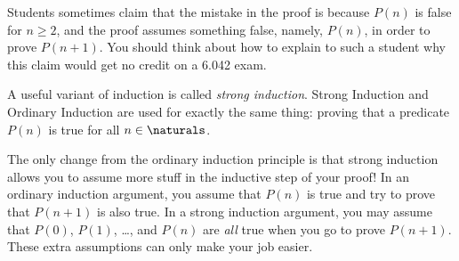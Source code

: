 \fi %

Students sometimes claim that the mistake in the proof is because $P(n)$
is false for $n \geq 2$, and the proof assumes something false, namely,
$P(n)$, in order to prove $P(n+1)$.  You should think about how to explain
to such a student why this claim would get no credit on a 6.042 exam.

\begin{problems}
\classproblems
{}
\homeworkproblems
{}
\end{problems}



A useful variant of induction is called {\em strong induction}.  Strong
Induction and Ordinary Induction are used for exactly the same thing:
proving that a predicate $P(n)$ is true for all $n \in \naturals$.


The only change from the ordinary induction principle is that strong
induction allows you to assume more stuff in the inductive step of your
proof!  In an ordinary induction argument, you assume that $P(n)$ is true
and try to prove that $P(n+1)$ is also true.  In a strong induction
argument, you may assume that $P(0)$, $P(1)$, \dots, and $P(n)$ are
\textit{all} true when you go to prove $P(n+1)$.  These extra assumptions
can only make your job easier.

